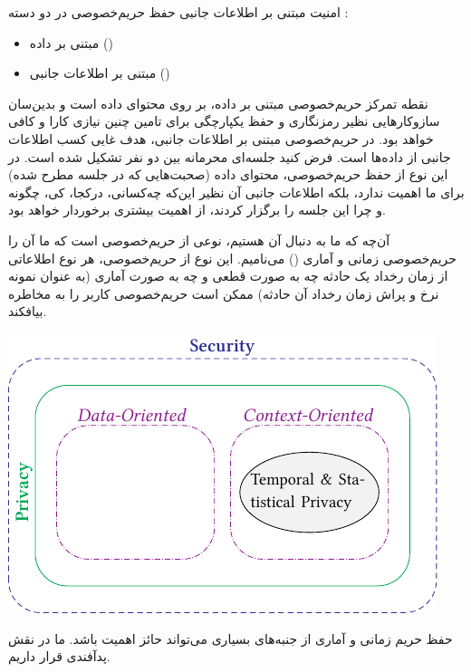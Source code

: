 \documentclass[debug,a0paper,portrait,persian]{xebaposter}
\begin{document}
\begin{poster}
\begin{posterbox}[name=imagedataset,column=0,span=1,below=introduction]{امنیت مبتنی بر اطلاعات جانبی}
حفظ‌ حریم‌خصوصی در دو دسته
\cite[صفحه 202]{mason2014sensing}:
\begin{itemize}
\item 
 مبتنی بر داده
()
\item
مبتنی بر اطلاعات جانبی
()
\end{itemize}
نقطه تمرکز حریم‌خصوصی مبتنی بر  داده، بر روی محتوای داده است و بدین‌سان سازوکارهایی نظیر رمزنگاری و حفظ یکپارچگی برای تامین چنین نیازی کارا و کافی خواهد بود. در حریم‌خصوصی مبتنی بر اطلاعات جانبی، هدف غایی کسب اطلاعات جانبی  از داده‌ها است. فرض کنید جلسه‌ای محرمانه بین دو نفر تشکیل شده است. در این نوع از  حفظ حریم‌خصوصی، محتوای داده (صحبت‌هایی که در جلسه مطرح شده) برای ما اهمیت ندارد، بلکه اطلاعات جانبی آن نظیر  این‌که چه‌کسانی، درکجا، کی، چگونه و چرا این جلسه را برگزار کردند، از اهمیت بیشتری برخوردار خواهد بود. 

آن‌چه که ما به دنبال آن هستیم، نوعی از حریم‌خصوصی است که ما آن را حریم‌خصوصی زمانی و آماری
()
می‌نامیم. این نوع از حریم‌خصوصی،  هر نوع اطلاعاتی از زمان رخداد یک حادثه چه به صورت قطعی و چه به صورت آماری (به عنوان نمونه
نرخ و پراش زمان رخداد آن حادثه)  ممکن است حریم‌خصوصی کاربر را به مخاطره بیافکند.
\vskip 3mm
  \centerline{\includegraphics[width=.9\linewidth]{images/WhatInThesis}}

حفظ حریم زمانی و آماری از جنبه‌های بسیاری می‌تواند حائز اهمیت باشد. ما در نقش پدآفندی قرار داریم. 


\end{posterbox}


\end{poster}
\end{document}
